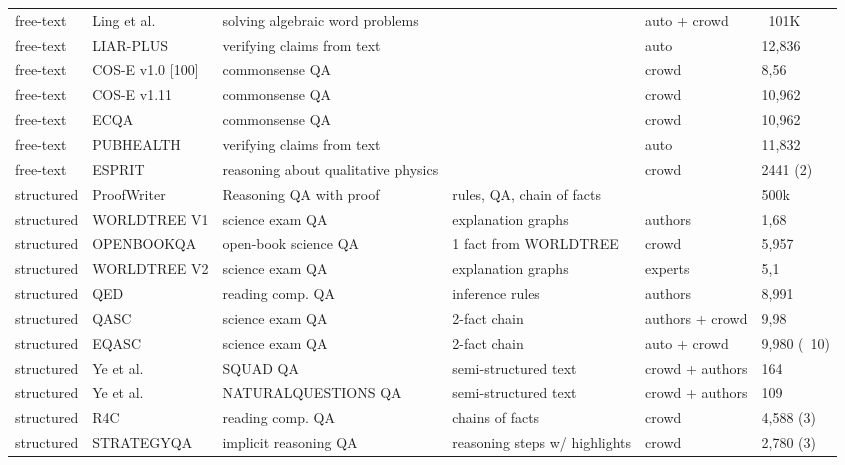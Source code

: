\documentclass[acmsmall]{acmart}
\begin{document}
\begin{table}
\begin{tabular}{T T T T T T}
free-text & Ling et al.  & solving algebraic word problems &  & auto + crowd & ~101K \\ 
free-text & LIAR-PLUS & verifying claims from text &  & auto & 12,836 \\ 
free-text & COS-E v1.0 [100] & commonsense QA &  & crowd & 8,56 \\ 
free-text & COS-E v1.11 & commonsense QA &  & crowd & 10,962 \\ 
free-text & ECQA & commonsense QA &  & crowd & 10,962 \\ 
free-text & PUBHEALTH & verifying claims from text &  & auto & 11,832 \\ 
free-text & ESPRIT & reasoning about qualitative physics &  & crowd & 2441 (2) \\ 
structured & ProofWriter & Reasoning QA with proof & rules, QA, chain of facts &  & 500k \\ 
structured & WORLDTREE V1 & science exam QA & explanation graphs & authors & 1,68 \\ 
structured & OPENBOOKQA & open-book science QA & 1 fact from WORLDTREE & crowd & 5,957 \\ 
structured & WORLDTREE V2 & science exam QA & explanation graphs & experts & 5,1 \\ 
structured & QED & reading comp. QA & inference rules & authors & 8,991 \\ 
structured & QASC & science exam QA & 2-fact chain & authors + crowd & 9,98 \\ 
structured & EQASC & science exam QA & 2-fact chain & auto + crowd & 9,980 (~10) \\ 
structured & Ye et al. & SQUAD QA & semi-structured text & crowd + authors & 164 \\ 
structured & Ye et al. & NATURALQUESTIONS QA & semi-structured text & crowd + authors & 109 \\ 
structured & R4C & reading comp. QA & chains of facts & crowd & 4,588 (3) \\ 
structured & STRATEGYQA & implicit reasoning QA & reasoning steps w/ highlights & crowd & 2,780 (3) \\  

\bottomrule
\end{tabular}
\end{table}
\end{document}
